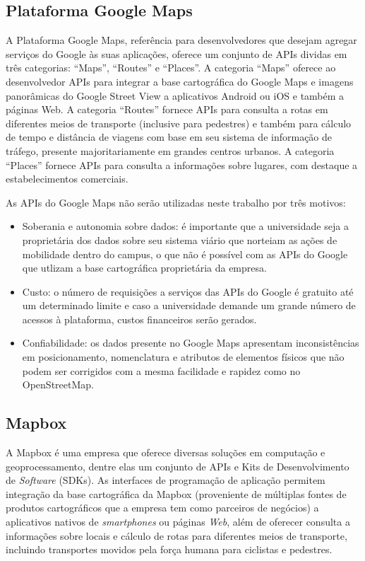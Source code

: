 \documentclass[oneside,openright,12pt]{ufsm_2015} %
\begin{document}
\subsection{Plataforma Google Maps}

A Plataforma Google Maps, referência para desenvolvedores que desejam agregar serviços do Google às suas aplicações, oferece um conjunto de APIs dividas em três categorias: ``Maps'', ``Routes'' e ``Places''. 
A categoria ``Maps'' oferece ao desenvolvedor APIs para integrar a base cartográfica do Google Maps e imagens panorâmicas do Google Street View a aplicativos Android ou iOS e também a páginas Web.
A categoria ``Routes'' fornece APIs para consulta a rotas em diferentes meios de transporte (inclusive para pedestres) e também para cálculo de tempo e distância de viagens com base em seu sistema de informação de tráfego, presente majoritariamente em grandes centros urbanos.
A categoria ``Places'' fornece APIs para consulta a informações sobre lugares, com destaque a estabelecimentos comerciais.

As APIs do Google Maps não serão utilizadas neste trabalho por três motivos:

\begin{itemize}
    \item Soberania e autonomia sobre dados: é importante que a universidade seja a proprietária dos dados sobre seu sistema viário que norteiam as ações de mobilidade dentro do campus, o que não é possível com as APIs do Google que utlizam a base cartográfica proprietária da empresa.
    \item Custo: o número de requisições a serviços das APIs do Google é gratuito até um determinado limite e caso a universidade demande um grande número de acessos à plataforma, custos financeiros serão gerados.
    \item Confiabilidade: os dados presente no Google Maps apresentam inconsistências em posicionamento, nomenclatura e atributos de elementos físicos que não podem ser corrigidos com a mesma facilidade e rapidez como no OpenStreetMap.
\end{itemize}

\subsection{Mapbox}
A Mapbox é uma empresa que oferece diversas soluções em computação e geoprocessamento, dentre elas um conjunto de APIs e  Kits de Desenvolvimento de \textit{Software} (SDKs). 
As interfaces de programação de aplicação permitem integração da base cartográfica da Mapbox (proveniente de múltiplas fontes de produtos cartográficos que a empresa tem como parceiros de negócios) a aplicativos nativos de \textit{smartphones} ou páginas \textit{Web}, além de oferecer consulta a informações sobre locais e cálculo de rotas para diferentes meios de transporte, incluindo transportes movidos pela força humana para ciclistas e pedestres.
\end{document}
